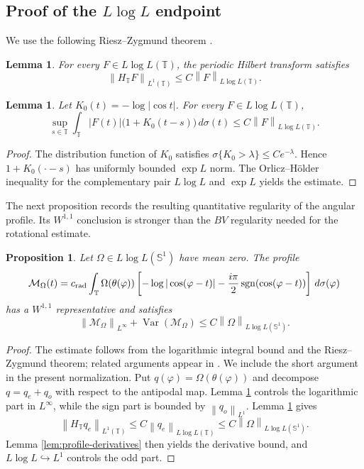 \documentclass[11pt]{amsart}
\newtheorem{proposition}[definition]{Proposition}
\newtheorem{lemma}[definition]{Lemma}
\theoremstyle{remark}
\numberwithin{equation}{section}
\newcommand{\T}{\mathbb T}
\newcommand{\Sph}{\mathbb S^1}
\newcommand{\cM}{\mathcal M}
\newcommand{\norm}[1]{\left\lVert #1\right\rVert}
\newcommand{\sgn}{\operatorname{sgn}}
\newcommand{\Var}{\operatorname{Var}}
\begin{document}
	\subsection{Proof of the \texorpdfstring{\(L\log L\)}{L log L} endpoint}
	
	We use the following Riesz--Zygmund theorem
	\cite[Chapter~VII]{Zygmund1959}.
	
	\begin{lemma}
		\label{lem:zygmund}
		For every \(F\in L\log L(\T)\), the periodic Hilbert transform satisfies
		\[
		\norm{H_\T F}_{L^1(\T)}
		\le
		C\norm F_{L\log L(\T)}.
		\]
	\end{lemma}
	\begin{lemma}\label{lem:log-orlicz}
		Let \(K_0(t)=-\log|\cos t|\).  For every \(F\in L\log L(\T)\),
		\[
		\sup_{s\in\T}\int_\T |F(t)|\bigl(1+K_0(t-s)\bigr)\,d\sigma(t)
		\le C\norm F_{L\log L(\T)}.
		\]
	\end{lemma}
	
	\begin{proof}
		The distribution function of \(K_0\) satisfies
		\(\sigma\{K_0>\lambda\}\le Ce^{-\lambda}\).  Hence \(1+K_0(\cdot-s)\) has
		uniformly bounded \(\exp L\) norm.  The Orlicz--H\"older inequality for the
		complementary pair \(L\log L\) and \(\exp L\) yields the estimate.
	\end{proof}
	
	The next proposition records the resulting quantitative regularity of the
	angular profile.  Its \(W^{1,1}\) conclusion is stronger than the \(BV\)
	regularity needed for the rotational estimate.
	
	\begin{proposition}\label{prop:profile-bv}
		Let \(\Omega\in L\log L(\Sph)\) have mean zero.  The profile
		\[
		\cM_\Omega(t)
		=
		c_{\rm rad}\int_\T
		\Omega(\theta(\varphi))
		\left[
		-\log|\cos(\varphi-t)|
		-\frac{i\pi}{2}\sgn(\cos(\varphi-t))
		\right]\,d\sigma(\varphi)
		\]
		has a \(W^{1,1}\) representative and satisfies
		\[
		\norm{\cM_\Omega}_{L^\infty}
		+
		\Var(\cM_\Omega)
		\le
		C\norm{\Omega}_{L\log L(\Sph)}.
		\]
	\end{proposition}
	
	\begin{proof}
		The estimate follows from the logarithmic integral bound and the
		Riesz--Zygmund theorem; related arguments appear in
		\cite{GrafakosStefanovSurvey1999,Stefanov2000}.  We include the short argument
		in the present normalization.  Put \(q(\varphi)=\Omega(\theta(\varphi))\) and
		decompose \(q=q_e+q_o\) with respect to
		the antipodal map.  Lemma \ref{lem:log-orlicz} controls the logarithmic part
		in \(L^\infty\), while the sign part is bounded by \(\norm{q_o}_{L^1}\).
		Lemma \ref{lem:zygmund} gives
		\[
		\norm{H_\T q_e}_{L^1(\T)}
		\le
		C\norm{q_e}_{L\log L(\T)}
		\le
		C\norm{\Omega}_{L\log L(\Sph)}.
		\]
		Lemma \ref{lem:profile-derivatives} then yields the derivative bound, and
		\(L\log L\hookrightarrow L^1\) controls the odd part.
	\end{proof}
	
\end{document}
